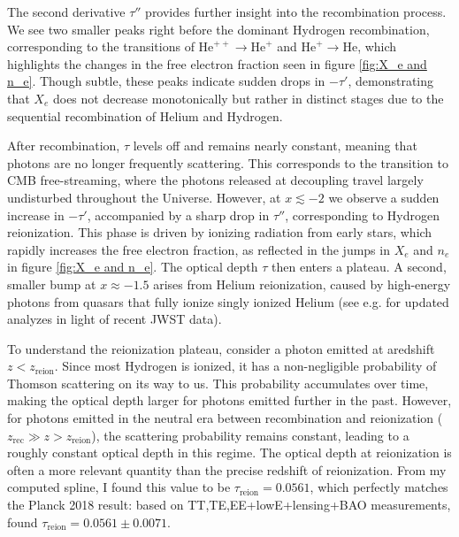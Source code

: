 \documentclass{aa}
\numberwithin{equation}{section}
\numberwithin{table}{section}
\numberwithin{figure}{section}
\begin{document}
The second derivative $\tau''$ provides further insight into the recombination process. We see two smaller peaks right before the dominant Hydrogen recombination, corresponding to the transitions of $\text{He}^{++} \rightarrow \text{He}^{+}$ and $\text{He}^{+} \rightarrow \text{He}$, which highlights the changes in the free electron fraction seen in figure \ref{fig:X_e and n_e}. Though subtle, these peaks indicate sudden drops in $-\tau'$, demonstrating that $X_e$ does not decrease monotonically but rather in distinct stages due to the sequential recombination of Helium and Hydrogen.

After recombination, $\tau$ levels off and remains nearly constant, meaning that photons are no longer frequently scattering. This corresponds to the transition to CMB free-streaming, where the photons released at decoupling travel largely undisturbed throughout the Universe. However, at $x \lesssim -2$ we observe a sudden increase in $-\tau'$, accompanied by a sharp drop in $\tau''$, corresponding to Hydrogen reionization. This phase is driven by ionizing radiation from early stars, which rapidly increases the free electron fraction, as reflected in the jumps in $X_e$ and $n_e$ in figure \ref{fig:X_e and n_e}. The optical depth $\tau$ then enters a plateau. A second, smaller bump at $x \approx -1.5$ arises from Helium reionization, caused by high-energy photons from quasars that fully ionize singly ionized Helium (see e.g. \cite{Helium} for updated analyzes in light of recent JWST data).

To understand the reionization plateau, consider a photon emitted at aredshift $z<z_\text{reion}$. Since most Hydrogen is ionized, it has a non-negligible probability of Thomson scattering on its way to us. This probability accumulates over time, making the optical depth larger for photons emitted further in the past. However, for photons emitted in the neutral era between recombination and reionization ($z_\text{rec} \gg z > z_\text{reion}$), the scattering probability remains constant, leading to a roughly constant optical depth in this regime. The optical depth at reionization is often a more relevant quantity than the precise redshift of reionization. From my computed spline, I found this value to be $\tau_\text{reion} = 0.0561$, which perfectly matches the Planck 2018 result: based on TT,TE,EE+lowE+lensing+BAO measurements, \cite{Planck} found $\tau_\text{reion} = 0.0561 \pm 0.0071$.
\end{document}
